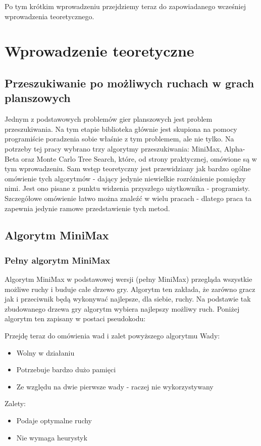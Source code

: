\documentclass[polish,shortabstract,inz]{iithesis}
\begin{document}
Po tym krótkim wprowadzeniu przejdziemy teraz do zapowiadanego wcześniej wprowadzenia teoretycznego.


\chapter{Wprowadzenie teoretyczne}
\section{Przeszukiwanie po możliwych ruchach w grach planszowych}
Jednym z podstawowych problemów gier planszowych jest problem przeszukiwania.
Na tym etapie biblioteka głównie jest skupiona na pomocy programiście poradzenia sobie właśnie z tym problemem, ale nie tylko.
Na potrzeby tej pracy wybrano trzy algorytmy przeszukiwania: MiniMax, Alpha-Beta oraz Monte Carlo Tree Search, które, od strony praktycznej, omówione są w tym wprowadzeniu.
Sam wstęp teoretyczny jest przewidziany jak bardzo ogólne omówienie tych algorytmów - dający jedynie niewielkie rozróżnienie pomiędzy nimi.
Jest ono pisane z punktu widzenia przyszłego użytkownika - programisty.
Szczegółowe omówienie łatwo można znaleźć w wielu pracach - dlatego praca ta zapewnia jedynie ramowe przedstawienie tych metod.



\section{Algorytm MiniMax}
\subsection{Pełny algorytm MiniMax}
Algorytm MiniMax w podstawowej wersji (pełny MiniMax) przegląda wszystkie możliwe ruchy i buduje całe drzewo gry.
Algorytm ten zakłada, że zarówno gracz jak i przeciwnik będą wykonywać najlepsze, dla siebie, ruchy.
Na podstawie tak zbudowanego drzewa gry algorytm wybiera najlepszy możliwy ruch.
Poniżej algorytm ten zapisany w postaci pseudokodu:

\newpage


Przejdę teraz do omówienia wad i zalet powyższego algorytmu
\newline Wady:
\begin{itemize}
  \item Wolny w działaniu
  \item Potrzebuje bardzo dużo pamięci
  \item Ze względu na dwie pierwsze wady - raczej nie wykorzystywany
\end{itemize}
Zalety:
\begin{itemize}
  \item Podaje optymalne ruchy
  \item Nie wymaga heurystyk
\end{itemize}
\end{document}
